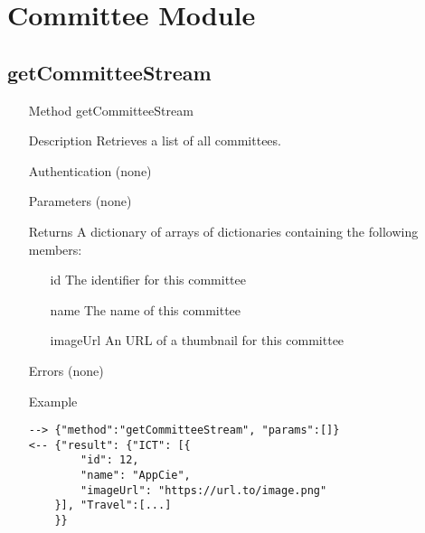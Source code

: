 \documentclass[a4paper]{scrreprt}
\begin{document}
\clearpage
\section{Committee Module}
\subsection{getCommitteeStream}
\begin{enumerate}
\item[Method] getCommitteeStream
\item[Description] Retrieves a list of all committees.
\item[Authentication] (none)
\item[Parameters] (none)
\item[Returns] A dictionary of arrays of dictionaries containing the following members:
\begin{enumerate}
    \item[id] The identifier for this committee
    \item[name] The name of this committee
    \item[imageUrl] An URL of a thumbnail for this committee
	\end{enumerate}
\item[Errors] (none)
\item[Example]
\begin{lstlisting}
--> {"method":"getCommitteeStream", "params":[]}
<-- {"result": {"ICT": [{
        "id": 12,
        "name": "AppCie",
        "imageUrl": "https://url.to/image.png"
    }], "Travel":[...]
    }}
\end{lstlisting}
\end{enumerate}
\clearpage
\end{document}
